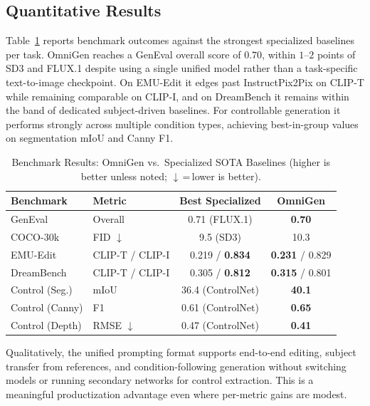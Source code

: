 \documentclass[conference]{IEEEtran}
\begin{document}
\subsection{Quantitative Results}
Table~\ref{tab:generation_results} reports benchmark outcomes against the strongest specialized baselines per task. OmniGen reaches a GenEval overall score of $0.70$, within $1$--$2$ points of SD3 \cite{sd3} and FLUX.1 \cite{flux2024} despite using a single unified model rather than a task-specific text-to-image checkpoint. On EMU-Edit it edges past InstructPix2Pix \cite{brooks2023instructpix2pix} on CLIP-T while remaining comparable on CLIP-I, and on DreamBench it remains within the band of dedicated subject-driven baselines. For controllable generation it performs strongly across multiple condition types, achieving best-in-group values on segmentation mIoU and Canny F1.

\begin{table}[htbp]
\caption{Benchmark Results: OmniGen vs.\ Specialized SOTA Baselines (higher is better unless noted; $\downarrow$\,=\,lower is better).}
\label{tab:generation_results}
\centering
\renewcommand{\arraystretch}{1.15}
\begin{tabular}{l l c c}
\toprule
\textbf{Benchmark} & \textbf{Metric} & \textbf{Best Specialized} & \textbf{OmniGen} \\
\midrule
GenEval         & Overall          & 0.71 (FLUX.1)              & \textbf{0.70} \\
COCO-30k        & FID $\downarrow$  & 9.5 (SD3)                  & 10.3 \\
EMU-Edit        & CLIP-T / CLIP-I  & 0.219 / \textbf{0.834}     & \textbf{0.231} / 0.829 \\
DreamBench      & CLIP-T / CLIP-I  & 0.305 / \textbf{0.812}     & \textbf{0.315} / 0.801 \\
Control (Seg.)  & mIoU             & 36.4 (ControlNet)          & \textbf{40.1} \\
Control (Canny) & F1               & 0.61 (ControlNet)          & \textbf{0.65} \\
Control (Depth) & RMSE $\downarrow$ & 0.47 (ControlNet)         & \textbf{0.41} \\
\bottomrule
\end{tabular}
\end{table}

Qualitatively, the unified prompting format supports end-to-end editing, subject transfer from references, and condition-following generation without switching models or running secondary networks for control extraction. This is a meaningful productization advantage even where per-metric gains are modest.
\end{document}
